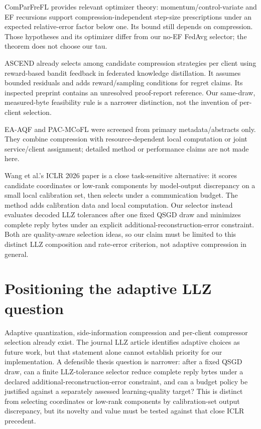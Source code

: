 \documentclass[11pt,a4paper]{article}
\begin{document}
ComParFreFL provides relevant optimizer theory: momentum/control-variate and EF recursions support compression-independent step-size prescriptions under an expected relative-error factor below one. Its bound still depends on compression. Those hypotheses and its optimizer differ from our no-EF FedAvg selector; the theorem does not choose our tau. \parencite{yan2026robustcompression}

ASCEND already selects among candidate compression strategies per client using reward-based bandit feedback in federated knowledge distillation. It assumes bounded residuals and adds reward/sampling conditions for regret claims. Its inspected preprint contains an unresolved proof-report reference. Our same-draw, measured-byte feasibility rule is a narrower distinction, not the invention of per-client selection. \parencite{liu2026ascend}

EA-AQF and PAC-MCoFL were screened from primary metadata/abstracts only. They combine compression with resource-dependent local computation or joint service/client assignment; detailed method or performance claims are not made here. \parencite{ikram2026eaaqf,tan2025pacmcofl}

Wang et al.'s ICLR 2026 paper is a close task-sensitive alternative: it scores candidate coordinates or low-rank components by model-output discrepancy on a small local calibration set, then selects under a communication budget. The method adds calibration data and local computation. Our selector instead evaluates decoded LLZ tolerances after one fixed QSGD draw and minimizes complete reply bytes under an explicit additional-reconstruction-error constraint. Both are quality-aware selection ideas, so our claim must be limited to this distinct LLZ composition and rate-error criterion, not adaptive compression in general. \parencite{wang2026discrepancy}

\section{Positioning the adaptive LLZ question}

Adaptive quantization, side-information compression and per-client compressor selection already exist. The journal LLZ article identifies adaptive choices as future work, but that statement alone cannot establish priority for our implementation. A defensible thesis question is narrower: after a fixed QSGD draw, can a finite LLZ-tolerance selector reduce complete reply bytes under a declared additional-reconstruction-error constraint, and can a budget policy be justified against a separately assessed learning-quality target? This is distinct from selecting coordinates or low-rank components by calibration-set output discrepancy, but its novelty and value must be tested against that close ICLR precedent. \parencite{cao2026llz,wang2026discrepancy}
\end{document}
